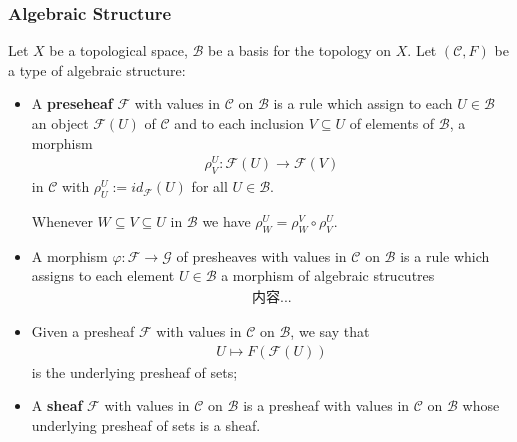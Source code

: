\documentclass[Total.tex]{subfiles}
\begin{document}
				\subsubsection{Algebraic Structure}
				\begin{Def}
					Let $X$ be a topological space, $\mathcal{B}$ be a basis for the topology on $X$. Let $(\mathcal{C},F)$ be a type of algebraic structure:
					\begin{itemize}
						\item A \textbf{preseheaf} $\mathcal{F}$ with values in $\mathcal{C}$ on $\mathcal{B}$ is a rule which assign to each $U\in \mathcal{B}$ an object $\mathcal{F}(U)$ of $\mathcal{C}$ and to each inclusion $V\subseteq U$ of elements of $\mathcal{B}$, a morphism
						\begin{gather*}
							\rho^U_V:\mathcal{F}(U)\rightarrow \mathcal{F}(V)
						\end{gather*}
						in $\mathcal{C}$ with $\rho^U_U:=id_\mathcal{F}(U)$ for all $U\in \mathcal{B}$.
						
						Whenever $W\subseteq V\subseteq U$ in $\mathcal{B}$ we have $\rho^U_W=\rho^V_W\circ \rho^U_V$.
						\item A morphism $\varphi:\mathcal{F}\rightarrow \mathcal{G}$ of presheaves with values in $\mathcal{C}$ on $\mathcal{B}$ is a rule which assigns to each element $U\in \mathcal{B}$ a morphism of algebraic strucutres
						\begin{gather*}
							内容...
						\end{gather*}
						\item Given a presheaf $\mathcal{F}$ with values in $\mathcal{C}$ on $\mathcal{B}$, we say that 
						\begin{gather*}
							U\mapsto F(\mathcal{F}(U))
						\end{gather*}
						is the underlying presheaf of sets;
						\item A \textbf{sheaf} $\mathcal{F}$ with values in $\mathcal{C}$ on $\mathcal{B}$ is a presheaf with values in $\mathcal{C}$ on $\mathcal{B}$ whose underlying presheaf of sets is a sheaf.
					\end{itemize}
				\end{Def}
				
\end{document}
